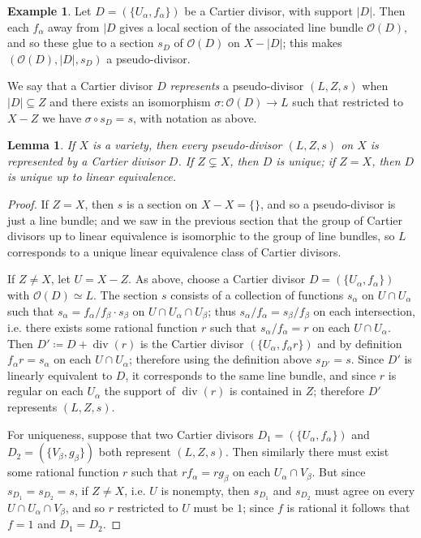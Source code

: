 \documentclass[leqno, openany]{memoir}
\newtheorem{lem}[thm]{Lemma}
\theoremstyle{definition}
\newtheorem{exm}[thm]{Example}
\theoremstyle{remark}
\theoremstyle{plain}
\theoremstyle{definition}
\theoremstyle{remark}
\newcommand{\mc}[1]{\mathcal{#1}}
\renewcommand{\div}{\operatorname{div}}
\begin{document}
\begin{exm}
Let $D = (\{U_\alpha, f_\alpha\})$ be a Cartier divisor, with support $|D|$. Then each $f_\alpha$ away from $|D$ gives a local section of the associated line bundle $\mc{O}(D)$, and so these glue to a section $s_D$ of $\mc{O}(D)$ on $X-|D|$; this makes $(\mc{O}(D), |D|, s_D)$ a pseudo-divisor.

We say that a Cartier divisor $D$ \textit{represents} a pseudo-divisor $(L,Z,s)$ when $|D| \subseteq Z$ and there exists an isomorphism $\sigma\colon \mc{O}(D) \to L$ such that restricted to $X-Z$ we have $\sigma \circ s_D = s$, with notation as above.
\end{exm}

\begin{lem}
If $X$ is a variety, then every pseudo-divisor $(L,Z,s)$ on $X$ is represented by a Cartier divisor $D$. If $Z \subsetneq X$, then $D$ is unique; if $Z = X$, then $D$ is unique up to linear equivalence.
\end{lem}
\begin{proof}
If $Z = X$, then $s$ is a section on $X - X = \{\}$, and so a pseudo-divisor is just a line bundle; and we saw in the previous section that the group of Cartier divisors up to linear equivalence is isomorphic to the group of line bundles, so $L$ corresponds to a unique linear equivalence class of Cartier divisors.

If $Z \neq X$, let $U = X - Z$. As above, choose a Cartier divisor $D = (\{U_\alpha, f_\alpha\})$ with $\mc{O}(D) \simeq L$. The section $s$ consists of a collection of functions $s_\alpha$ on $U \cap U_\alpha$ such that $s_\alpha = f_\alpha/f_\beta \cdot s_\beta$ on $U \cap U_\alpha \cap U_\beta$; thus $s_\alpha/f_\alpha = s_\beta/f_\beta$ on each intersection, i.e. there exists some rational function $r$ such that $s_\alpha / f_\alpha = r$ on each $U \cap U_\alpha$. Then $D' \coloneqq D + \div(r)$ is the Cartier divisor $(\{U_\alpha, f_\alpha r\})$ and by definition $f_\alpha r = s_\alpha$ on each $U \cap U_\alpha$; therefore using the definition above $s_{D'} = s$. Since $D'$ is linearly equivalent to $D$, it corresponds to the same line bundle, and since $r$ is regular on each $U_\alpha$ the support of $\div(r)$ is contained in $Z$; therefore $D'$ represents $(L,Z,s)$.

For uniqueness, suppose that two Cartier divisors $D_1 = (\{U_\alpha, f_\alpha\})$ and $D_2 = (\{V_\beta, g_\beta\})$ both represent $(L,Z,s)$. Then similarly there must exist some rational function $r$ such that $r f_\alpha = r g_\beta$ on each $U_\alpha \cap V_\beta$. But since $s_{D_1} = s_{D_2} = s$, if $Z \neq X$, i.e. $U$ is nonempty, then $s_{D_1}$ and $s_{D_2}$ must agree on every $U \cap U_\alpha \cap V_\beta$, and so $r$ restricted to $U$ must be $1$; since $f$ is rational it follows that $f = 1$ and $D_1 = D_2$.
\end{proof}
\end{document}
